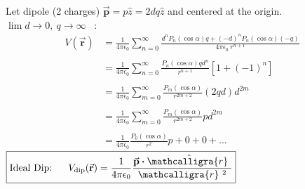 \documentclass[12pt]{article}
\newcommand{\scripty}[1]{\ensuremath{\mathcalligra{#1}}}
\newcommand*{\cursrr}{\scripty{r}\ }
\newcommand*{\dotP}{\boldsymbol \cdot}		%
\begin{document}
\vspace{15pt}
\begin{minipage}[t]{0.48\textwidth}
	Let dipole (2 charges) \( \vec{ \mathbf{p} } = p \hat{z} = 2dq \hat{z} \) and centered at the origin. \\[15pt]
	\(\lim d \rightarrow 0, \ q \rightarrow \infty \) \ :
	\begin{align*}
		V( \vec{ \mathbf{r} } ) &= \frac{1}{4 \pi \epsilon_0} \sum_{n=0}^\infty 
			\frac{ d^n P_n (\cos{\alpha}) q+ (-d)^n P_n (\cos{\alpha}) (-q) }{4 \pi \epsilon_0 \ r^{n+1}} \\ \\
		&= \frac{1}{4 \pi \epsilon_0} \sum_{n=0}^\infty \frac{ P_n (\cos{\alpha}) q d^n }{r^{n+1}} [ 1 + (-1)^n ] \\ \\
		&= \frac{1}{4 \pi \epsilon_0} \sum_{m=0}^\infty \frac{ P_m (\cos{\alpha}) }{r^{2m+2}} (2 q d) d^{2m} \\ \\
		&= \frac{1}{4 \pi \epsilon_0} \sum_{m=0}^\infty \frac{ P_m (\cos{\alpha}) }{r^{2m+2}} p d^{2m} \\ \\
		&= \frac{1}{4 \pi \epsilon_0} \frac{ P_0 (\cos{\alpha}) }{r^{2}} p + 0 + 0 + ...
	\end{align*}
	\hfill \break
	\( \boxed{ \text{Ideal Dip:} \ \ \ \ \  V_{ \text{dip} }( \vec{ \mathbf{r} } ) 
		= \frac{1}{4 \pi \epsilon_0} \frac{ \vec{ \mathbf{p} } \dotP \hat{\cursrr} }{\cursrr^{2}} } \)
\end{minipage}
\hfill\vline\hfill
\end{document}
